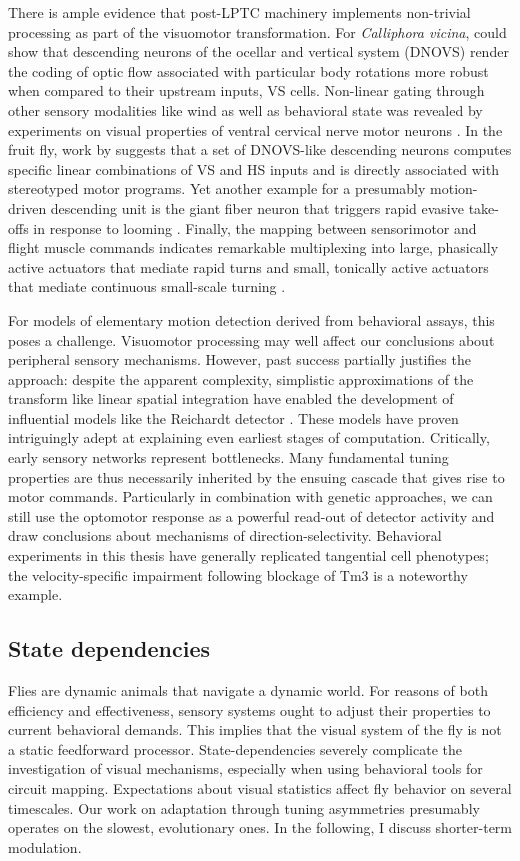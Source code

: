 There is ample evidence that post-LPTC machinery implements non-trivial processing as part of the visuomotor transformation. For \textit{Calliphora vicina}, \citet{Wertz:2009hb} could show that descending neurons of the ocellar and vertical system (DNOVS) render the coding of optic flow associated with particular body rotations more robust when compared to their upstream inputs, VS cells. Non-linear gating through other sensory modalities like wind as well as behavioral state was revealed by experiments on visual properties of ventral cervical nerve motor neurons \citep{Haag:2010fy}. In the fruit fly, work by \citet{Suver:2016aa} suggests that a set of DNOVS-like descending neurons computes specific linear combinations of VS and HS inputs and is directly associated with stereotyped motor programs. Yet another example for a presumably motion-driven descending unit is the giant fiber neuron that triggers rapid evasive take-offs in response to looming \citep{Reyn:2014aa}. Finally, the mapping between sensorimotor and flight muscle commands indicates remarkable multiplexing into large, phasically active actuators that mediate rapid turns and small, tonically active actuators that mediate continuous small-scale turning \citep{Lindsay:2017aa}.

For models of elementary motion detection derived from behavioral assays, this poses a challenge. Visuomotor processing may well affect our conclusions about peripheral sensory mechanisms. However, past success partially justifies the approach: despite the apparent complexity, simplistic approximations of the transform like linear spatial integration have enabled the development of influential models like the Reichardt detector \citep{Hassenstein:1956fa}. These models have proven intriguingly adept at explaining even earliest stages of computation. Critically, early sensory networks represent bottlenecks. Many fundamental tuning properties are thus necessarily inherited by the ensuing cascade that gives rise to motor commands. Particularly in combination with genetic approaches, we can still use the optomotor response as a powerful read-out of detector activity and draw conclusions about mechanisms of direction-selectivity. Behavioral experiments in this thesis have generally replicated tangential cell phenotypes; the velocity-specific impairment following blockage of Tm3 is a noteworthy example.


\subsection{State dependencies}
Flies are dynamic animals that navigate a dynamic world. For reasons of both efficiency and effectiveness, sensory systems ought to adjust their properties to current behavioral demands. This implies that the visual system of the fly is not a static feedforward processor. State-dependencies severely complicate the investigation of visual mechanisms, especially when using behavioral tools for circuit mapping. Expectations about visual statistics affect fly behavior on several timescales. Our work on adaptation through tuning asymmetries presumably operates on the slowest, evolutionary ones. In the following, I discuss shorter-term modulation.

